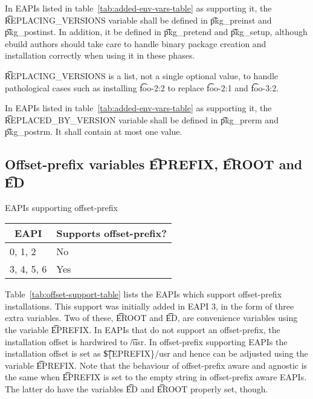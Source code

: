  In EAPIs listed in table~\ref{tab:added-env-vars-table} as
supporting it, the \t{REPLACING\_VERSIONS} variable shall be defined in \t{pkg\_preinst} and
\t{pkg\_postinst}.  In addition, it  be defined in \t{pkg\_pretend} and \t{pkg\_setup},
although ebuild authors should take care to handle binary package creation and installation
correctly when using it in these phases.

\t{REPLACING\_VERSIONS} is a list, not a single optional value, to handle pathological cases such as
installing \t{foo-2:2} to replace \t{foo-2:1} and \t{foo-3:2}.

In EAPIs listed in table~\ref{tab:added-env-vars-table} as supporting it, the
\t{REPLACED\_BY\_VERSION} variable shall be defined in \t{pkg\_prerm} and \t{pkg\_postrm}. It shall
contain at most one value.

\subsection{Offset-prefix variables \t{EPREFIX}, \t{EROOT} and \t{ED}}
\label{sec:offset-vars}

\begin{centertable}{EAPIs supporting offset-prefix}
    \label{tab:offset-support-table}
    \begin{tabular}{ll}
      \toprule
      \multicolumn{1}{c}{\textbf{EAPI}} &
      \multicolumn{1}{c}{\textbf{Supports offset-prefix?}}\\
      \midrule
      0, 1, 2           & No  \\
      3, 4, 5, 6        & Yes \\
      \bottomrule
    \end{tabular}
\end{centertable}

 Table~\ref{tab:offset-support-table} lists the EAPIs which
support offset-prefix installations. This support was initially added in EAPI 3, in the form of
three extra variables. Two of these, \t{EROOT} and \t{ED}, are convenience variables using the
variable \t{EPREFIX}\@. In EAPIs that do not support an offset-prefix, the installation offset is
hardwired to \t{/usr}. In offset-prefix supporting EAPIs the installation offset is set as
\t{\$\{EPREFIX\}/usr} and hence can be adjusted using the variable \t{EPREFIX}\@. Note that the
behaviour of offset-prefix aware and agnostic is the same when \t{EPREFIX} is set to the empty
string in offset-prefix aware EAPIs. The latter do have the variables \t{ED} and \t{EROOT} properly
set, though.


